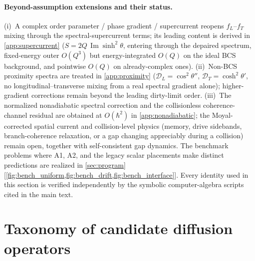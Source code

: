 \documentclass[
  aps,
  prb,
  preprint,
  superscriptaddress,
  longbibliography,
  nofootinbib
]{revtex4-2}
\newcommand{\fL}{f_L}
\newcommand{\fT}{f_T}
\newcommand{\Imag}{\operatorname{Im}}
\begin{document}
\paragraph{Beyond-assumption extensions and their status.}
(i)~A complex order parameter / phase gradient / supercurrent reopens
$\fL$--$\fT$ mixing through the spectral-supercurrent terms; its leading
content is derived in \cref{app:supercurrent}
($S=2Q\,\Imag\sinh^2\theta$, entering through the depaired spectrum,
fixed-energy outer $O(Q^3)$ but energy-integrated $O(Q)$ on the ideal BCS
background, and pointwise $O(Q)$ on already-complex ones).
(ii)~Non-BCS proximity spectra are treated in \cref{app:proximity}
($\mathcal D_L=\cos^2\theta''$, $\mathcal D_T=\cosh^2\theta'$, no
longitudinal--transverse mixing from a real spectral gradient alone);
higher-gradient corrections remain beyond the leading dirty-limit order.
(iii)~The normalized nonadiabatic spectral correction and the collisionless
coherence-channel residual are obtained at $O(\hbar^2)$ in
\cref{app:nonadiabatic}; the Moyal-corrected spatial current and collision-level
physics (memory, drive sidebands, branch-coherence relaxation, or a gap
changing appreciably during a collision) remain open, together with
self-consistent gap dynamics. The benchmark problems where A1, A2, and the
legacy scalar placements make distinct predictions are realized in
\cref{sec:program} [\cref{fig:bench_uniform,fig:bench_drift,fig:bench_interface}]. Every identity used
in this section is verified independently by the symbolic computer-algebra
scripts cited in the main text.

\section{Taxonomy of candidate diffusion operators}
\label{sec:taxonomy}
\end{document}
